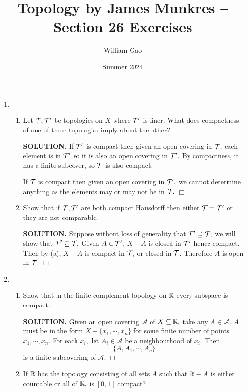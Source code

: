 \documentclass{article}
\title{Topology by James Munkres -- Section 26 Exercises}
\author{William Gao}
\date{Summer 2024}
\begin{document}
\maketitle

\begin{enumerate}
    \item \begin{enumerate}
        \item Let $\mathcal{T}, \mathcal{T}'$ be topologies on $X$ where $\mathcal{T}'$ is finer. What does compactness of one of these topologies imply about the other?

        {\bf SOLUTION.} If $\mathcal{T}'$ is compact then given an open covering in $\mathcal{T},$ each element is in $\mathcal{T}'$ so it is also an open covering in $\mathcal{T}'.$ By compactness, it has a finite subcover, so $\mathcal{T}$ is also compact.

        If $\mathcal{T}$ is compact then given an open covering in $\mathcal{T}',$ we cannot determine anything as the elements may or may not be in $\mathcal{T}.$ $\Box$

        \item Show that if $\mathcal{T}, \mathcal{T}'$ are both compact Hausdorff then either $\mathcal{T} = \mathcal{T}'$ or they are not comparable.

        {\bf SOLUTION.} Suppose without loss of generality that $\mathcal{T}' \supseteq \mathcal{T};$ we will show that $\mathcal{T}' \subseteq \mathcal{T}.$ Given $A \in \mathcal{T}',$ $X-A$ is closed in $\mathcal{T}'$ hence compact. Then by (a), $X-A$ is compact in $\mathcal{T},$ or closed in $\mathcal{T}$. Therefore $A$ is open in $\mathcal{T}.$ $\Box$
    \end{enumerate}

    \item \begin{enumerate}
        \item Show that in the finite complement topology on $\mathbb{R}$ every subspace is compact.

        {\bf SOLUTION.} Given an open covering $\mathcal{A}$ of $X \subseteq \mathbb{R},$ take any $A \in \mathcal{A}.$ $A$ must be in the form $X - \{x_1, \cdots, x_n\}$ for some finite number of points $x_1, \cdots, x_n.$ For each $x_i,$ let $A_i \in \mathcal{A}$ be a neighbourhood of $x_i.$ Then 
        $$\{A, A_1, \cdots, A_n\}$$
        is a finite subcovering of $\mathcal{A}$. $\Box$

        \item If $\mathbb{R}$ has the topology consisting of all sets $A$ such that $\mathbb{R} - A$ is either countable or all of $\mathbb{R},$ is $[0, 1]$ compact?


\end{enumerate}
\end{enumerate}
\end{document}
